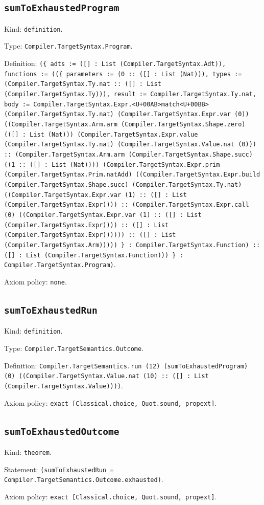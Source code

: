 \documentclass[11pt]{article}
\begin{document}
\subsection*{\texttt{sumToExhaustedProgram}}
\noindent Kind: \texttt{definition}.\par
\noindent Type: \texttt{Compiler.TargetSyntax.Program}.\par
\noindent Definition: \texttt{(\{ adts := ([] : List (Compiler.TargetSyntax.Adt)), functions := ((\{ parameters := (0 :: ([] : List (Nat))), types := (Compiler.TargetSyntax.Ty.nat :: ([] : List (Compiler.TargetSyntax.Ty))), result := Compiler.TargetSyntax.Ty.nat, body := Compiler.TargetSyntax.Expr.<U+00AB>match<U+00BB> (Compiler.TargetSyntax.Ty.nat) (Compiler.TargetSyntax.Expr.var (0)) ((Compiler.TargetSyntax.Arm.arm (Compiler.TargetSyntax.Shape.zero) (([] : List (Nat))) (Compiler.TargetSyntax.Expr.value (Compiler.TargetSyntax.Ty.nat) (Compiler.TargetSyntax.Value.nat (0))) :: (Compiler.TargetSyntax.Arm.arm (Compiler.TargetSyntax.Shape.succ) ((1 :: ([] : List (Nat)))) (Compiler.TargetSyntax.Expr.prim (Compiler.TargetSyntax.Prim.natAdd) ((Compiler.TargetSyntax.Expr.build (Compiler.TargetSyntax.Shape.succ) (Compiler.TargetSyntax.Ty.nat) ((Compiler.TargetSyntax.Expr.var (1) :: ([] : List (Compiler.TargetSyntax.Expr)))) :: (Compiler.TargetSyntax.Expr.call (0) ((Compiler.TargetSyntax.Expr.var (1) :: ([] : List (Compiler.TargetSyntax.Expr)))) :: ([] : List (Compiler.TargetSyntax.Expr)))))) :: ([] : List (Compiler.TargetSyntax.Arm))))) \} : Compiler.TargetSyntax.Function) :: ([] : List (Compiler.TargetSyntax.Function))) \} : Compiler.TargetSyntax.Program)}.\par
\noindent Axiom policy: \texttt{none}.\par
\subsection*{\texttt{sumToExhaustedRun}}
\noindent Kind: \texttt{definition}.\par
\noindent Type: \texttt{Compiler.TargetSemantics.Outcome}.\par
\noindent Definition: \texttt{Compiler.TargetSemantics.run (12) (sumToExhaustedProgram) (0) ((Compiler.TargetSyntax.Value.nat (10) :: ([] : List (Compiler.TargetSyntax.Value))))}.\par
\noindent Axiom policy: \texttt{exact [Classical.choice, Quot.sound, propext]}.\par
\subsection*{\texttt{sumToExhaustedOutcome}}
\noindent Kind: \texttt{theorem}.\par
\noindent Statement: \texttt{(sumToExhaustedRun = Compiler.TargetSemantics.Outcome.exhausted)}.\par
\noindent Axiom policy: \texttt{exact [Classical.choice, Quot.sound, propext]}.\par
\end{document}
